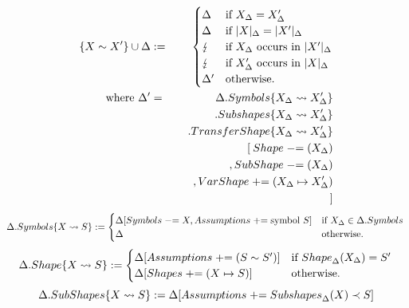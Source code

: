 \documentclass[english, mgr]{iithesis}
\begin{document}
\begin{eqnarray*}
\{X \sim X'\} \cup \Delta & := &
  \begin{cases}
    \Delta     &\text{if }  X_{\Delta} =  X'_{\Delta} \\
    \Delta &\text{if }  |X|_{\Delta} =  |X'|_{\Delta} \\
    \lightning     &\text{if }  {\ensuremath{ X_{\Delta}}}\text{ occurs in }{\ensuremath{ |X'|_{\Delta}}} \\
    \lightning     &\text{if }  {\ensuremath{ X'_{\Delta}}}\text{ occurs in }{\ensuremath{ |X|_{\Delta}}} \\
    \Delta' &\text{otherwise.}\\
  \end{cases} \\
  \text{where } \Delta' & = & \Delta .{Symbols}     \{ X_{\Delta} \leadsto  X'_{\Delta}\}\\
                        &   & \quad .{Subshapes}    \{ X_{\Delta} \leadsto  X'_{\Delta}\} \\
                        &   & \quad .{TransferShape}\{ X_{\Delta} \leadsto  X'_{\Delta}\} \\
                        &   & \quad [\: {Shape}    \mathrel{-}= ( X_{\Delta}) \\
                        &   & \quad ,   {SubShape} \mathrel{-}= ( X_{\Delta}) \\
                        &   & \quad ,   {VarShape} \mathrel{+}=  ( X_{\Delta} \mapsto  X_{\Delta}') \\
                        &   & \quad ]
\end{eqnarray*}
$$
\Delta.{Symbols}\{X \leadsto S\} :=
  \begin{cases}
    \Delta[{Symbols} \mathrel{-}= X, {Assumptions} \mathrel{+}= \text{symbol } S]    &\text{if }  X_{\Delta} \in \Delta.{Symbols} \\
    \Delta &\text{otherwise.}\\
  \end{cases} \\
$$
$$
\Delta.{Shape}\{X \leadsto S\} :=
  \begin{cases}
    \Delta[{Assumptions} \mathrel{+}= (S \sim S')]    &\text{if } {Shape}_{\Delta}( X_{\Delta}) = S' \\
    \Delta[{Shapes}      \mathrel{+}= (X \mapsto S)] &\text{otherwise.}\\
  \end{cases} \\
$$
$$
\Delta.{SubShapes}\{X \leadsto S\} :=
  \Delta[{Assumptions} \mathrel{+}= {Subshapes}_{\Delta}(X) \prec S]
$$
\end{document}
